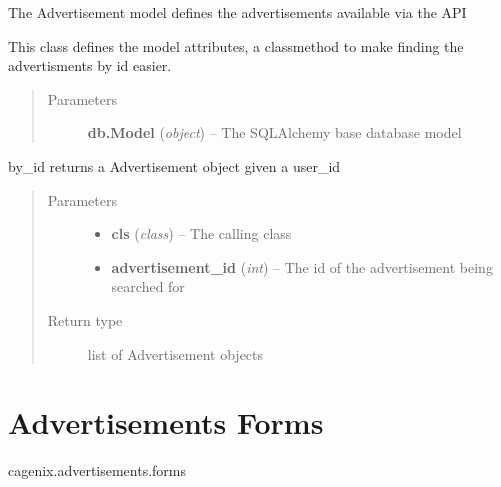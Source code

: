 \documentclass[letterpaper,10pt,english]{sphinxmanual}
\begin{document}
\begin{fulllineitems}
\label{dev-advertisements:cagenix.advertisements.models.Advertisement}
The Advertisement model defines the advertisements available via the API

This class defines the model attributes, a classmethod to make finding
the advertisments by id easier.
\begin{quote}\begin{description}
\item[{Parameters}] \leavevmode
\textbf{db.Model} (\emph{object}) -- The SQLAlchemy base database model

\end{description}\end{quote}

\begin{fulllineitems}
\label{dev-advertisements:cagenix.advertisements.models.Advertisement.by_id}
by\_id returns a Advertisement object given a user\_id
\begin{quote}\begin{description}
\item[{Parameters}] \leavevmode\begin{itemize}
\item {} 
\textbf{cls} (\emph{class}) -- The calling class

\item {} 
\textbf{advertisement\_id} (\emph{int}) -- The id of the advertisement being searched for

\end{itemize}

\item[{Return type}] \leavevmode
list of Advertisement objects

\end{description}\end{quote}

\end{fulllineitems}


\end{fulllineitems}



\section{Advertisements Forms}
\label{dev-advertisements:module-cagenix.advertisements.forms}\label{dev-advertisements:advertisements-forms}\label{dev-advertisements:advertisements-forms-label}
cagenix.advertisements.forms
\end{document}
